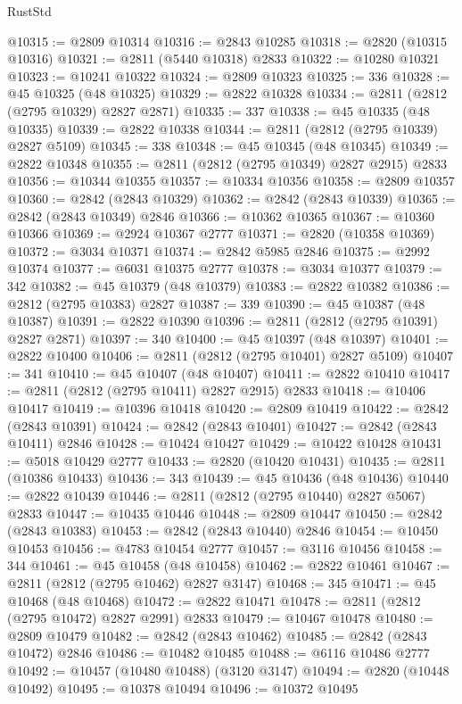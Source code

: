 \begin{lexlean}{RustStd}
\begin{coremodule}
@10315 := @2809 @10314
@10316 := @2843 @10285
@10318 := @2820 (@10315 @10316)
@10321 := @2811 (@5440 @10318) @2833
@10322 := @10280 @10321
@10323 := @10241 @10322
@10324 := @2809 @10323
@10325 := 336
@10328 := @45 @10325 (@48 @10325)
@10329 := @2822 @10328
@10334 := @2811 (@2812 (@2795 @10329) @2827 @2871)
@10335 := 337
@10338 := @45 @10335 (@48 @10335)
@10339 := @2822 @10338
@10344 := @2811 (@2812 (@2795 @10339) @2827 @5109)
@10345 := 338
@10348 := @45 @10345 (@48 @10345)
@10349 := @2822 @10348
@10355 := @2811 (@2812 (@2795 @10349) @2827 @2915) @2833
@10356 := @10344 @10355
@10357 := @10334 @10356
@10358 := @2809 @10357
@10360 := @2842 (@2843 @10329)
@10362 := @2842 (@2843 @10339)
@10365 := @2842 (@2843 @10349) @2846
@10366 := @10362 @10365
@10367 := @10360 @10366
@10369 := @2924 @10367 @2777
@10371 := @2820 (@10358 @10369)
@10372 := @3034 @10371
@10374 := @2842 @5985 @2846
@10375 := @2992 @10374
@10377 := @6031 @10375 @2777
@10378 := @3034 @10377
@10379 := 342
@10382 := @45 @10379 (@48 @10379)
@10383 := @2822 @10382
@10386 := @2812 (@2795 @10383) @2827
@10387 := 339
@10390 := @45 @10387 (@48 @10387)
@10391 := @2822 @10390
@10396 := @2811 (@2812 (@2795 @10391) @2827 @2871)
@10397 := 340
@10400 := @45 @10397 (@48 @10397)
@10401 := @2822 @10400
@10406 := @2811 (@2812 (@2795 @10401) @2827 @5109)
@10407 := 341
@10410 := @45 @10407 (@48 @10407)
@10411 := @2822 @10410
@10417 := @2811 (@2812 (@2795 @10411) @2827 @2915) @2833
@10418 := @10406 @10417
@10419 := @10396 @10418
@10420 := @2809 @10419
@10422 := @2842 (@2843 @10391)
@10424 := @2842 (@2843 @10401)
@10427 := @2842 (@2843 @10411) @2846
@10428 := @10424 @10427
@10429 := @10422 @10428
@10431 := @5018 @10429 @2777
@10433 := @2820 (@10420 @10431)
@10435 := @2811 (@10386 @10433)
@10436 := 343
@10439 := @45 @10436 (@48 @10436)
@10440 := @2822 @10439
@10446 := @2811 (@2812 (@2795 @10440) @2827 @5067) @2833
@10447 := @10435 @10446
@10448 := @2809 @10447
@10450 := @2842 (@2843 @10383)
@10453 := @2842 (@2843 @10440) @2846
@10454 := @10450 @10453
@10456 := @4783 @10454 @2777
@10457 := @3116 @10456
@10458 := 344
@10461 := @45 @10458 (@48 @10458)
@10462 := @2822 @10461
@10467 := @2811 (@2812 (@2795 @10462) @2827 @3147)
@10468 := 345
@10471 := @45 @10468 (@48 @10468)
@10472 := @2822 @10471
@10478 := @2811 (@2812 (@2795 @10472) @2827 @2991) @2833
@10479 := @10467 @10478
@10480 := @2809 @10479
@10482 := @2842 (@2843 @10462)
@10485 := @2842 (@2843 @10472) @2846
@10486 := @10482 @10485
@10488 := @6116 @10486 @2777
@10492 := @10457 (@10480 @10488) (@3120 @3147)
@10494 := @2820 (@10448 @10492)
@10495 := @10378 @10494
@10496 := @10372 @10495

\end{coremodule}
\end{lexlean}
